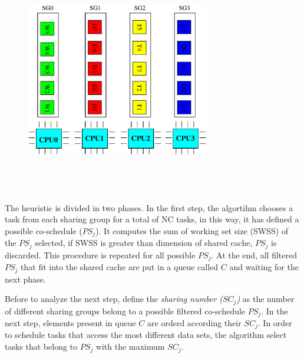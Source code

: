\begin{description}
\begin{figure}[htbp]
\centering
{
\includegraphics[width=8cm,height=10cm, keepaspectratio]{images/possible_cosched.eps}
}
\caption{}
\label{fig:possible_cosched}
\end{figure}

The heuristic is divided in two phases. In the first step, the algortihm chooses a task from each sharing group for a total of NC tasks, in this way, it
has defined a possible co-schedule ($PS_j$). It computes the sum of working set size (SWSS) of the $PS_j$ selected, if SWSS is greater than dimension of 
shared cache, $PS_j$ is discarded. This procedure is repeated for all possible $PS_j$. At the end, all filtered $PS_j$ that fit into the shared cache are 
put in a queue called $C$ and waiting for the next phase.

Before to analyze the next step, define the \textit{sharing number ($SC_j$)} as the number of different sharing groups belong to a possible filtered 
co-schedule $PS_j$. In the next step, elements present in queue $C$ are orderd according their $SC_j$. In order to schedule tasks that access the most 
different data sets, the algorithm select tasks that belong to $PS_j$ with the maximum $SC_j$.


\end{description}
